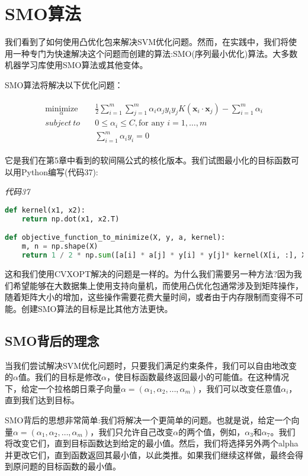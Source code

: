 \chapter{SMO算法}

我们看到了如何使用凸优化包来解决SVM优化问题。然而，在实践中，我们将使用一种专门为快速解决这个问题而创建的算法:SMO(序列最小优化)算法。大多数机器学习库使用SMO算法或其他变体。

SMO算法将解决以下优化问题：

\begin{gather*}
\begin{align*}
\underset{\alpha}{\text{minimize}} \quad & \frac{1}{2}\sum_{i=1}^m\sum_{j=1}^m \alpha_i \alpha_j y_i y_j K(\mathbf{x}_i \cdot \mathbf{x}_j) -\sum_{i=1}^m \alpha_i \\
subject\ to \quad & 0 \leq \alpha_i \leq C,\text{for any }i=1,\dots,m \\
& \sum_{i=1}^m \alpha_i y_i = 0
\end{align*}
\end{gather*}

它是我们在第5章中看到的软间隔公式的核化版本。我们试图最小化的目标函数可以用Python编写(代码37):

\emph{代码37}

\begin{lstlisting}[language=python]
def kernel(x1, x2): 
    return np.dot(x1, x2.T) 

def objective_function_to_minimize(X, y, a, kernel): 
    m, n = np.shape(X) 
    return 1 / 2 * np.sum([a[i] * a[j] * y[i] * y[j]* kernel(X[i, :], X[j, :]) for j in range(m) for i in range(m)])\ - np.sum([a[i] for i in range(m)])
\end{lstlisting}

这和我们使用CVXOPT解决的问题是一样的。为什么我们需要另一种方法?因为我们希望能够在大数据集上使用支持向量机，而使用凸优化包通常涉及到矩阵操作，随着矩阵大小的增加，这些操作需要花费大量时间，或者由于内存限制而变得不可能。创建SMO算法的目标是比其他方法更快。

\section{SMO背后的理念}
当我们尝试解决SVM优化问题时，只要我们满足约束条件，我们可以自由地改变的$\alpha$值。我们的目标是修改$\alpha$，使目标函数最终返回最小的可能值。在这种情况下，给定一个拉格朗日乘子向量$\alpha=(\alpha_1,\alpha_2,\dots,\alpha_m)$，我们可以改变任意值$\alpha_i$，直到我们达到目标。

SMO背后的思想非常简单:我们将解决一个更简单的问题。也就是说，给定一个向量$\alpha=(\alpha_1,\alpha_2,\dots,\alpha_m)$，我们只允许自己改变$\alpha$的两个值，例如，$\alpha_3$和$\alpha_7$。我们将改变它们，直到目标函数达到给定的最小值。然后，我们将选择另外两个alpha并更改它们，直到函数返回其最小值，以此类推。如果我们继续这样做，最终会得到原问题的目标函数的最小值。

